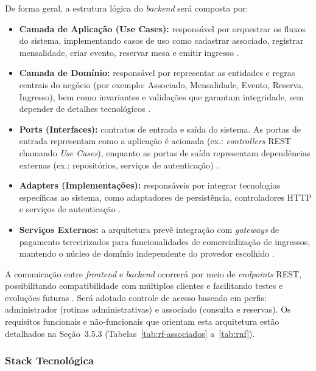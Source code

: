 ﻿\documentclass[12pt,a4paper]{article}
\begin{document}
De forma geral, a estrutura lógica do \textit{backend} será composta por:
\begin{itemize}[leftmargin=*]
    \item \textbf{Camada de Aplicação (Use Cases):} responsável por orquestrar os fluxos do sistema, implementando casos de uso como cadastrar associado, registrar mensalidade, criar evento, reservar mesa e emitir ingresso \citep{martin2017}.

    \item \textbf{Camada de Domínio:} responsável por representar as entidades e regras centrais do negócio (por exemplo: Associado, Mensalidade, Evento, Reserva, Ingresso), bem como invariantes e validações que garantam integridade, sem depender de detalhes tecnológicos \citep{martin2017}.

    \item \textbf{Ports (Interfaces):} contratos de entrada e saída do sistema. As portas de entrada representam como a aplicação é acionada (ex.: \textit{controllers} REST chamando \textit{Use Cases}), enquanto as portas de saída representam dependências externas (ex.: repositórios, serviços de autenticação) \citep{cockburn2005,martin2017}.

    \item \textbf{Adapters (Implementações):} responsáveis por integrar tecnologias específicas ao sistema, como adaptadores de persistência, controladores HTTP e serviços de autenticação \citep{cockburn2005}.

    \item \textbf{Serviços Externos:} a arquitetura prevê integração com \textit{gateways} de pagamento terceirizados para funcionalidades de comercialização de ingressos, mantendo o núcleo de domínio independente do provedor escolhido \citep{martin2017}.
\end{itemize}

A comunicação entre \textit{frontend} e \textit{backend} ocorrerá por meio de \textit{endpoints} REST, possibilitando compatibilidade com múltiplos clientes e facilitando testes e evoluções futuras \citep{fielding2000}. Será adotado controle de acesso baseado em perfis: administrador (rotinas administrativas) e associado (consulta e reservas). Os requisitos funcionais e não-funcionais que orientam esta arquitetura estão detalhados na Seção~3.5.3 (Tabelas~\ref{tab:rf-associados} a~\ref{tab:rnf}).

\subsubsection{Stack Tecnológica}
\end{document}
